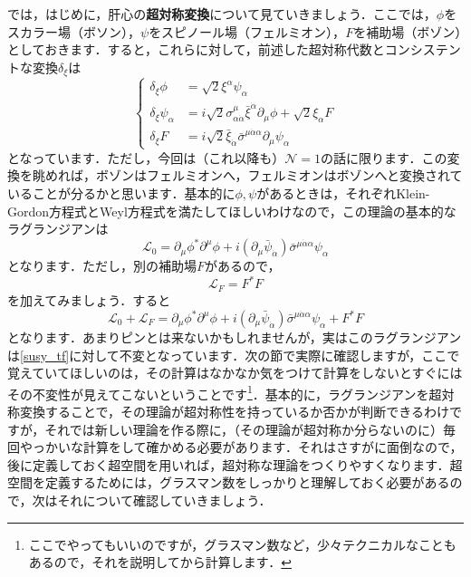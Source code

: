 \documentclass[a4paper,uplatex,dvipdfmx]{jsarticle}
\theoremstyle{definition}
\begin{document}
では，はじめに，肝心の\textbf{超対称変換}について見ていきましょう．ここでは，$\phi$をスカラー場（ボソン），$\psi$をスピノール場（フェルミオン），$F$を補助場（ボゾン）としておきます．すると，これらに対して，前述した超対称代数とコンシステントな変換$\delta_{\xi}$は
\begin{equation}
  \left\{
    \begin{alignedat}{1}
      \delta_{\xi}\phi
      &=
      \sqrt{2}\xi^{\alpha}\psi_{\alpha}
      \\
      \delta_{\xi}\psi_{\alpha}
      &=
      i\sqrt{2}\sigma^{\mu}_{\alpha\dot{\alpha}}\bar{\xi}^{\dot{\alpha}}\partial_{\mu}\phi+\sqrt{2}\xi_{\alpha}F
      \\
      \delta_{\xi}F
      &=
      i\sqrt{2}\bar{\xi}_{\dot{\alpha}}\bar{\sigma}^{\mu\dot{\alpha}\alpha}\partial_{\mu}\psi_{\alpha}      
    \end{alignedat}
  \right.
  \label{susy_tf}
\end{equation}
となっています．ただし，今回は（これ以降も）$\mathcal{N}=1$の話に限ります．この変換を眺めれば，ボゾンはフェルミオンへ，フェルミオンはボゾンへと変換されていることが分るかと思います．基本的に$\phi,\psi$があるときは，それぞれKlein-Gordon方程式とWeyl方程式を満たしてほしいわけなので，この理論の基本的なラグランジアンは
\begin{equation}
  \mathcal{L}_{0}
  =
  \partial_{\mu}\phi^{*}\partial^{\mu}\phi
  +
  i(\partial_{\mu}\bar{\psi}_{\dot{\alpha}})\bar{\sigma}^{\mu\dot{\alpha}\alpha}\psi_{\alpha}
\end{equation}
となります．ただし，別の補助場$F$があるので，
\begin{equation}
  \mathcal{L}_{F}
  =
  F^{*}F
\end{equation}
を加えてみましょう．すると
\begin{equation}
  \mathcal{L}_{0}+\mathcal{L}_{F}
  =
  \partial_{\mu}\phi^{*}\partial^{\mu}\phi
  +
  i(\partial_{\mu}\bar{\psi}_{\dot{\alpha}})\bar{\sigma}^{\mu\dot{\alpha}\alpha}\psi_{\alpha}
  +
  F^{*}F  
  \label{lagrangian_minimal}
\end{equation}
となります．あまりピンとは来ないかもしれませんが，実はこのラグランジアンは\eqref{susy_tf}に対して不変となっています．次の節で実際に確認しますが，ここで覚えていてほしいのは，その計算はなかなか気をつけて計算をしないとすぐにはその不変性が見えてこないということです\footnote{
  ここでやってもいいのですが，グラスマン数など，少々テクニカルなこともあるので，それを説明してから計算します．
}．基本的に，ラグランジアンを超対称変換することで，その理論が超対称性を持っているか否かが判断できるわけですが，それでは新しい理論を作る際に，（その理論が超対称か分らないのに）毎回やっかいな計算をして確かめる必要があります．それはさすがに面倒なので，後に定義しておく超空間を用いれば，超対称な理論をつくりやすくなります．超空間を定義するためには，グラスマン数をしっかりと理解しておく必要があるので，次はそれについて確認していきましょう．
\end{document}
